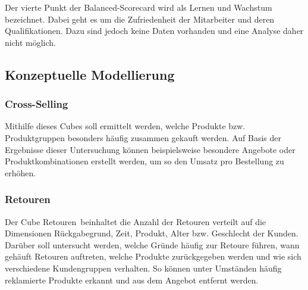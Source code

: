 Der vierte Punkt der Balanced-Scorecard wird als Lernen und Wachstum bezeichnet. Dabei geht es um die Zufriedenheit der Mitarbeiter und deren Qualifikationen. Dazu sind jedoch keine Daten vorhanden und eine Analyse daher nicht möglich.

\pagebreak

\subsection{Konzeptuelle Modellierung}

\subsubsection*{Cross-Selling}
\begin{figure}[htbp] 
  \centering
     
\end{figure}
\vspace{10cm}
Mithilfe dieses Cubes soll ermittelt werden, welche Produkte bzw. Produktgruppen besonders häufig zusammen gekauft werden. Auf Basis der Ergebnisse dieser Untersuchung können beispielsweise besondere Angebote oder Produktkombinationen erstellt werden, um so den Umsatz pro Bestellung zu erhöhen.
\pagebreak

\subsubsection*{Retouren}
\begin{figure}[htbp] 
  \centering
     
\end{figure}
\vspace{9cm}
Der Cube \glqq Retouren\grqq ~beinhaltet die Anzahl der Retouren verteilt auf die Dimensionen Rückgabegrund, Zeit, Produkt, Alter bzw. Geschlecht der Kunden. Darüber soll untersucht werden, welche Gründe häufig zur Retoure führen, wann gehäuft Retouren auftreten, welche Produkte zurückgegeben werden und wie sich verschiedene Kundengruppen verhalten. So können unter Umständen häufig reklamierte Produkte erkannt und aus dem Angebot entfernt werden.
\pagebreak




